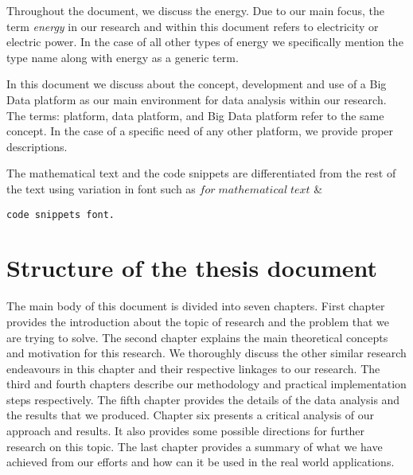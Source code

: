 Throughout the document, we discuss the energy. Due to our main focus, the term \emph{energy} in our research and within this document refers to electricity or electric power. In the case of all other types of energy we specifically mention the type name along with energy as a generic term.

In this document we discuss about the concept, development and use of a Big Data platform as our main environment for data analysis within our research. The terms: platform, data platform, and Big Data platform refer to the same concept. In the case of a specific need of any other platform, we provide proper descriptions.

The mathematical text and the code snippets are differentiated from the rest of the text using variation in font such as \(for\; mathematical\;text\) \& \begin{lstlisting}
code snippets font. \end{lstlisting}


\section{Structure of the thesis document}
\label{section:structure} 

The main body of this document is divided into seven chapters. First chapter provides the introduction about the topic of research and the problem that we are trying to solve. The second chapter explains the main theoretical concepts and motivation for this research. We thoroughly discuss the other similar research endeavours in this chapter and their respective linkages to our research. The third and fourth chapters describe our methodology and practical implementation steps respectively. The fifth chapter provides the details of the data analysis and the results that we produced. Chapter six presents a critical analysis of our approach and  results. It also provides some possible directions for further research on this topic. The last chapter provides a summary of what we have achieved from our efforts and how can it be used in the real world applications.



